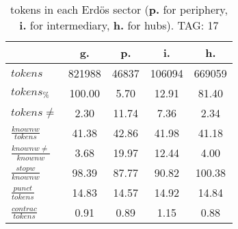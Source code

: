 \begin{table}[h!]
\begin{center}
\begin{tabular}{| l | c | c | c | c |}\hline
 & g. & p. & i. & h. \\\hline
$tokens$ & 821988  & 46837  & 106094  & 669059 \\\hline
$tokens_{\%}$ & 100.00  & 5.70  & 12.91  & 81.40 \\\hline
$tokens \neq$ & 2.30  & 11.74  & 7.36  & 2.34 \\\hline
$\frac{knownw}{tokens}$ & 41.38  & 42.86  & 41.98  & 41.18 \\\hline
$\frac{knownw \neq}{knownw}$ & 3.68  & 19.97  & 12.44  & 4.00 \\\hline
$\frac{stopw}{knownw}$ & 98.39  & 87.77  & 90.82  & 100.38 \\\hline
$\frac{punct}{tokens}$ & 14.83  & 14.57  & 14.92  & 14.84 \\\hline
$\frac{contrac}{tokens}$ & 0.91  & 0.89  & 1.15  & 0.88 \\\hline
\end{tabular}
\caption{tokens in each Erd\"os sector ({{\bf p.}} for periphery, {{\bf i.}} for intermediary, 
    {{\bf h.}} for hubs). TAG: 17}
\end{center}
\end{table}
